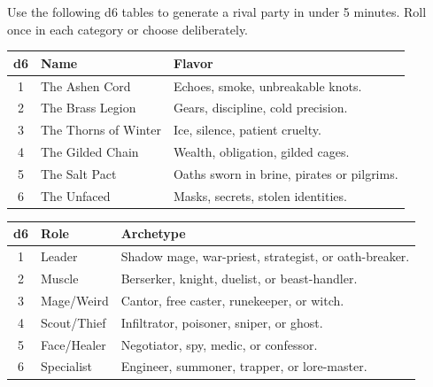 Use the following d6 tables to generate a rival party in under 5 minutes. Roll once in each category or choose deliberately.

\begin{tcolorbox}[title=Rival Party Name, colback=white!97!gray, colframe=black!80!gray,breakable]
\centering
\setlength{\tabcolsep}{6pt}
\begin{tabular}{cll}
\toprule
\textbf{d6} & \textbf{Name} & \textbf{Flavor} \\
\midrule
1 & The Ashen Cord & Echoes, smoke, unbreakable knots. \\
2 & The Brass Legion & Gears, discipline, cold precision. \\
3 & The Thorns of Winter & Ice, silence, patient cruelty. \\
4 & The Gilded Chain & Wealth, obligation, gilded cages. \\
5 & The Salt Pact & Oaths sworn in brine, pirates or pilgrims. \\
6 & The Unfaced & Masks, secrets, stolen identities. \\
\bottomrule
\end{tabular}
\end{tcolorbox}

\begin{tcolorbox}[title=Composition (3--5 members), colback=white!97!gray, colframe=black!80!gray,breakable]
\centering
\begin{tabular}{cll}
\toprule
\textbf{d6} & \textbf{Role} & \textbf{Archetype} \\
\midrule
1 & Leader & Shadow mage, war-priest, strategist, or oath-breaker. \\
2 & Muscle & Berserker, knight, duelist, or beast-handler. \\
3 & Mage/Weird & Cantor, free caster, runekeeper, or witch. \\
4 & Scout/Thief & Infiltrator, poisoner, sniper, or ghost. \\
5 & Face/Healer & Negotiator, spy, medic, or confessor. \\
6 & Specialist & Engineer, summoner, trapper, or lore-master. \\
\bottomrule
\end{tabular}
\end{tcolorbox}

